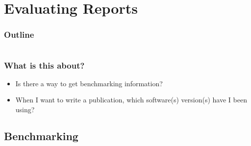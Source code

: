 \section{Evaluating Reports}

\begin{frame}
    \frametitle{Outline}
    \begin{columns}[t]
        \begin{column}{.5\textwidth}
            \tableofcontents[sections={1-9},currentsection]
        \end{column}
        \begin{column}{.5\textwidth}
            \tableofcontents[sections={10-18},currentsection]
        \end{column}
    \end{columns}
\end{frame}

\begin{frame}
  \frametitle{What is this about?}
   \begin{question}[Questions]
   	  \begin{itemize}
         \item Is there a way to get benchmarking information?
         \item When I want to write a publication, which software(s) version(s) have I been using?
      \end{itemize}
   \end{question}
\end{frame}

\subsection{Benchmarking}

